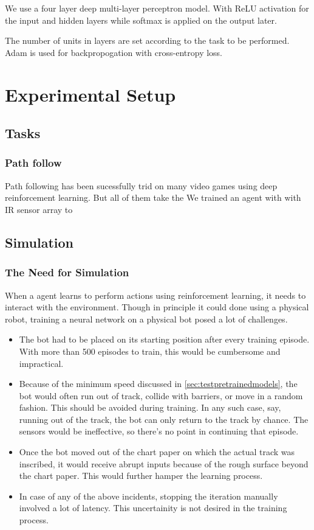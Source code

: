 \documentclass[12pt]{extreport}
\begin{document}
We use a four layer deep multi-layer perceptron model. With ReLU activation for
the input and hidden layers while softmax is applied on the output later.

The number of units in layers are set according to the task to be performed.
Adam is used for backpropogation with cross-entropy loss.

\chapter{Experimental Setup}

\section{Tasks}

\subsection{Path follow}
Path following has been sucessfully trid on many video games using deep
reinforcement learning. But all of them take the
We trained an agent with with IR sensor array to

\section{Simulation} \label{ch:simulation}

\subsection{The Need for Simulation}

When a agent learns to perform actions using reinforcement learning, it
needs to interact with the environment. Though in principle it could
done using a physical robot, training a neural network on a physical bot posed
a lot of challenges.

\begin{itemize}
 \item The bot had to be placed on its starting position after every training episode. With more than 500 episodes to train, this would be cumbersome and impractical.
 \item Because of the minimum speed discussed in \autoref{sec:testpretrainedmodels}, the bot would often run out of track, collide with barriers, or move in a random fashion. This should be avoided during training. In any such case, say, running out of the track, the bot can only return to the track by chance. The sensors would be ineffective, so there's no point in continuing that episode.
 \item Once the bot moved out of the chart paper on which the actual track was inscribed, it would receive abrupt inputs because of the rough surface beyond the chart paper. This would further hamper the learning process.
 \item In case of any of the above incidents, stopping the iteration manually involved a lot of latency. This uncertainity is not desired in the training process.
\end{itemize}
\end{document}

